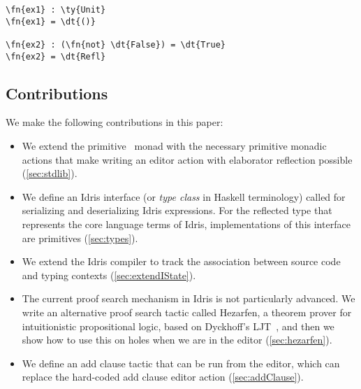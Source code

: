 \begin{Verbatim}
\fn{ex1} : \ty{Unit}
\fn{ex1} = \dt{()}

\fn{ex2} : (\fn{not} \dt{False}) = \dt{True}
\fn{ex2} = \dt{Refl}
\end{Verbatim}


\subsection{Contributions}

We make the following contributions in this paper:
\begin{itemize}
\item We extend the primitive \Elab\ monad with the necessary primitive monadic
actions that make writing an editor action with elaborator reflection possible
(\autoref{sec:stdlib}).
\item We define an Idris interface (or \emph{type class} in Haskell terminology)
called  for serializing and deserializing Idris expressions.
For the reflected type that represents the core language terms of Idris,
implementations of this interface are primitives (\autoref{sec:types}).
\item We extend the Idris compiler to track the association between source code
  and typing contexts (\autoref{sec:extendIState}).
\item The current proof search mechanism in Idris is not particularly advanced.
We write an alternative proof search tactic called Hezarfen, a
theorem prover for intuitionistic propositional logic, based on Dyckhoff's
LJT~\cite{ljt}, and then we show how to use this on holes when we are in
the editor (\autoref{sec:hezarfen}).
\item We define an add clause tactic that can be run from the editor, which can
replace the hard-coded add clause editor action (\autoref{sec:addClause}).
\end{itemize}


